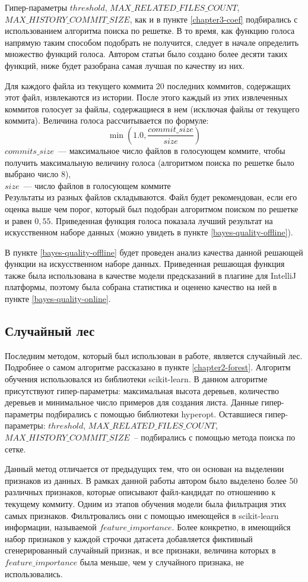 Гипер-параметры $threshold$, $MAX\_RELATED\_FILES\_COUNT$, $MAX\_HISTORY\_COMMIT\_SIZE$, как и в пункте \ref{chapter3-coef} подбирались с использованием алгоритма поиска по решетке. В то время, как функцию голоса напрямую таким способом подобрать не получится, следует в начале определить множество функций голоса. Автором статьи было создано более десяти таких функций, ниже будет разобрана самая лучшая по качеству из них.

Для каждого файла из текущего коммита 20 последних коммитов, содержащих этот файл, извлекаются из истории. После этого каждый из этих извлеченных коммитов голосует за файлы, содержащиеся в нем (исключая файлы от текущего коммита). Величина голоса рассчитывается по формуле: 
    $$\min(1.0, \frac{{commit\_size}}{{size}})$$
$commits\_size$~---  максимальное число файлов в голосующем коммите, чтобы получить максимальную величину голоса (алгоритмом поиска по решетке было выбрано число 8),\\
$size$~--- число файлов в голосующем коммите\\
Результаты из разных файлов складываются. Файл будет рекомендован, если его оценка выше чем порог, который был подобран алгоритмом поиском по решетке и равен $0,55$. Приведенная функция голоса показала лучший результат на искусственном наборе данных (можно увидеть в пункте \ref{bayes-quality-offline}).

В пункте \ref{bayes-quality-offline} будет проведен анализ качества данной решающей функции на искусственном наборе данных. Приведенная решающая функция также была использована в качестве модели предсказаний в плагине для IntelliJ платформы, поэтому была собрана статистика и оценено качество на ней в пункте \ref{bayes-quality-online}. 
    \subsection{Случайный лес}\label{chapter3-forest}
Последним методом, который был использован в работе, является случайный лес. Подробнее о самом алгоритме рассказано в пункте \ref{chapter2-forest}. Алгоритм обучения использовался из библиотеки scikit-learn. В данном алгоритме присутствуют гипер-параметры: максимальная высота деревьев, количество деревьев и минимальное число примеров для создания листа. Данные гипер-параметры подбирались с помощью библиотеки hyperopt. Оставшиеся гипер-параметры: $threshold$, $MAX\_RELATED\_FILES\_COUNT$, $MAX\_HISTORY\_COMMIT\_SIZE$~-- подбирались с помощью метода поиска по сетке. 

Данный метод отличается от предыдущих тем, что он основан на выделении признаков из данных. В рамках данной работы автором было выделено более 50 различных признаков, которые описывают файл-кандидат по отношению к текущему коммиту. Одним из этапов обучения модели была фильтрация этих самых признаков. Фильтровались они с помощью имеющейся в scikit-learn информации, называемой $feature\_importance$. Более конкретно, в имеющийся набор признаков у каждой строчки датасета добавляется фиктивный сгенерированный случайный признак, и все признаки, величина которых в $feature\_importance$ была меньше, чем у случайного признака, не использовались.

